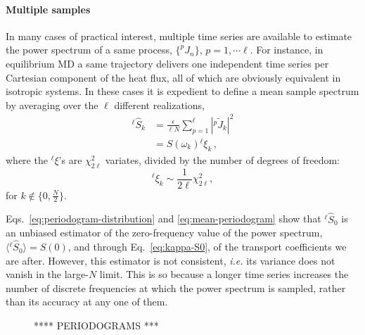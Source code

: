 \paragraph{Multiple samples}
In many cases of practical interest, multiple time series are available to estimate the power spectrum of a same process, $\{^{p\!}J_n\}$, $p=1, \cdots \ell$. For instance, in equilibrium MD a same trajectory delivers one independent time series per Cartesian component of the heat flux, all of which are obviously equivalent in isotropic systems. In these cases it is expedient to define a mean sample spectrum by averaging over the $\ell$ different realizations,
\begin{equation}
    \begin{aligned}
      {^{\ell\!}\hat{S}}_{k}& = \frac{\epsilon}{\ell N} \sum_{p=1}^{\ell}  \left |{^p\!}{\tilde J}_{k} \right |^2 \\
      & = S(\omega_k) {^{\ell\!}{\xi}_{k}} \,,
    \end{aligned}  \label{eq:mean-periodogram}
\end{equation}
where the ${^{\ell\!}\xi}$'s are $\chi_{2\ell}^2$ variates, divided by the number of degrees of freedom:
\begin{equation}
    ^{\ell\!}\xi_{k}\sim\frac{1}{2\ell}\chi_{2\ell}^{2}, \label{eq:chi-square-nu}
\end{equation}
for $k \notin \{ 0,\frac{N}{2} \}$.

Eqs.~\eqref{eq:periodogram-distribution} and \eqref{eq:mean-periodogram} show that ${^{\ell\!}}{\hat S_0}$ is an unbiased estimator of the zero-frequency value of the power spectrum, $\langle {^{\ell\!}}{\hat S_0} \rangle = S(0)$, and through Eq.~\eqref{eq:kappa-S0}, of the transport coefficients we are after.
However, this estimator is not consistent, \emph{i.e.} its variance does not vanish in the large-$N$ limit. This is so because a longer time series increases the number of discrete frequencies at which the power spectrum is sampled, rather than its accuracy at any one of them.

\begin{figure}
    \centering
    **** PERIODOGRAMS ***
    \label{fig:periodograms}
\end{figure}

